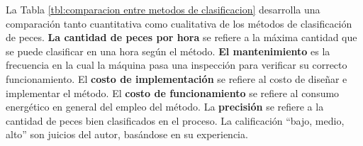 La Tabla \ref{tbl:comparacion entre metodos de clasificacion} desarrolla una comparación tanto cuantitativa como cualitativa de los métodos de clasificación de peces. \textbf{La cantidad de peces por hora} se refiere a la máxima cantidad que se puede clasificar en una hora según el método. \textbf{El mantenimiento} es la frecuencia en la cual la máquina pasa una inspección para verificar su correcto funcionamiento. El \textbf{costo de implementación} se refiere al costo de diseñar e implementar el método. El \textbf{costo de funcionamiento} se refiere al consumo energético en general del empleo del método. La \textbf{precisión} se refiere a la cantidad de peces bien clasificados en el proceso. La calificación “bajo, medio, alto” son juicios del autor, basándose en su experiencia.

